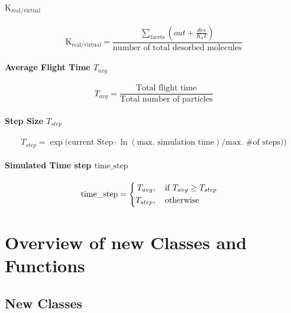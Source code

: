 \subsubsection*{$\text{K}_{\text{real}/\text{virtual}}$}
\begin{equation}
	\label{eq:krealvirt}
	\text{K}_{\text{real}/\text{virtual}}=\frac{\sum\limits_{\text{facets}}(out + \frac{des}{K_b T})}{\text{number of total desorbed molecules}}
\end{equation}

\subsubsection*{Average Flight Time $T_{avg}$}
\begin{equation}
	\label{eq:tavg}
	T_{avg}=\frac{\text{Total flight time}}{\text{Total number of particles}}
\end{equation}

\subsubsection*{Step Size $T_{step}$}
\begin{equation}
	\label{eq:tstep}
	T_{step}=\exp\Big(\text{current Step}\cdot \ln(\text{max. simulation time})/\text{max. \# of steps})\Big)
\end{equation}

\subsubsection*{Simulated Time step $\text{time}\_\text{step}$}
\begin{equation}
	\label{eq:timestep}
	\text{time}\_\text{step}=
	\begin{cases}
		\begin{split}
		T_{avg}&, \text{\quad if}\ T_{avg} \geq T_{step}\\
		T_{step}&,  \text{\quad otherwise}
		\end{split}
	\end{cases}
\end{equation}

\chapter{Overview of new Classes and Functions}
\section{New Classes}

